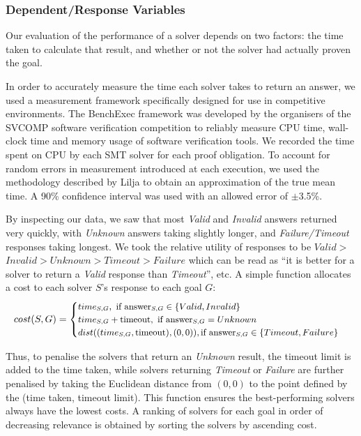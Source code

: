 \documentclass[runningheads,a4paper]{llncs}
\begin{document}


\subsubsection{Dependent/Response Variables}
\label{sec:dependant}

Our evaluation of the performance of a solver depends on two factors: the time taken to calculate that result, and whether or not the solver had actually proven the goal.

In order to accurately measure the time each solver takes to return an answer, we used a measurement framework specifically designed for use in competitive environments. The BenchExec \cite{benchexec} framework was developed by the organisers of the SVCOMP \cite{SVCOMP} software verification competition to reliably measure CPU time, wall-clock time and memory usage of software verification tools. We recorded the time spent on CPU by each SMT solver for each proof obligation. To account for random errors in measurement introduced at each execution, we used the methodology described by Lilja \cite{LiljaJ} to obtain an approximation of the true mean time. A 90\% confidence interval was used with an allowed error of $\pm$3.5\%.   

By inspecting our data, we saw that most \textit{Valid} and \textit{Invalid} answers returned very quickly, with \textit{Unknown} answers taking slightly longer, and \textit{Failure/Timeout} responses taking longest. We took the relative utility of responses to be $Valid >$ $Invalid>Unknown>Timeout>Failure$ which can be read as ``it is better for a solver to return a \textit{Valid} response than \textit{Timeout}'', etc. A simple function allocates a cost to each solver $S$'s response to each goal $G$:
\[\small
	cost(S,G) = 
	\begin{cases}
		time_{S,G}, \text{ if answer}_{S,G} \in \lbrace Valid, Invalid \rbrace \\
		time_{S,G} + \text{timeout}, \text{ if answer}_{S,G} = Unknown \\
		dist((time_{S,G},\text{timeout}), (0,0)), \text{if answer}_{S,G} \in \lbrace Timeout, Failure \rbrace
	\end{cases}
\]

Thus, to penalise the solvers that return an \textit{Unknown} result, the timeout limit is added to the time taken, while solvers returning \textit{Timeout} or \textit{Failure} are further penalised by taking the Euclidean distance from $(0,0)$ to the point defined by the (time taken, timeout limit). This function ensures the best-performing solvers always have the lowest costs. A ranking of solvers for each goal in order of decreasing relevance is obtained by sorting the solvers by ascending cost.
\end{document}
